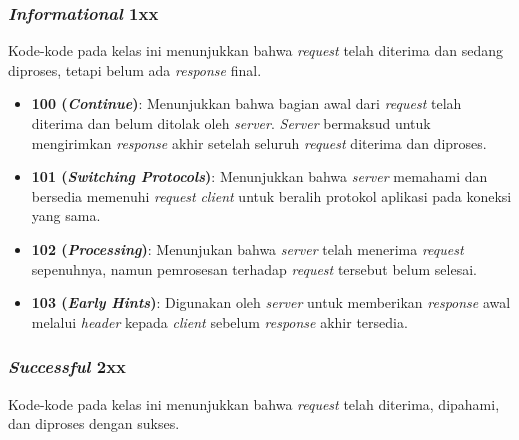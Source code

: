 \subsubsection{\textit{Informational} 1xx}
\label{subsubsec:020104-infotmational-1xx}

Kode-kode pada kelas ini menunjukkan bahwa \textit{request} telah diterima dan sedang diproses, tetapi belum ada \textit{response} final.

\begin{itemize}
    \item \textbf{100 (\textit{Continue})}: Menunjukkan bahwa bagian awal dari \textit{request} telah diterima dan belum ditolak oleh \textit{server}. \textit{Server} bermaksud untuk mengirimkan \textit{response} akhir setelah seluruh \textit{request} diterima dan diproses.
  
    \item \textbf{101 (\textit{Switching Protocols})}: Menunjukkan bahwa \textit{server} memahami dan bersedia memenuhi \textit{request} \textit{client} untuk beralih protokol aplikasi pada koneksi yang sama.
  
    \item \textbf{102 (\textit{Processing})}: Menunjukan bahwa \textit{server} telah menerima \textit{request} sepenuhnya, namun pemrosesan terhadap \textit{request} tersebut belum selesai.~\cite{RFC2518}
  
    \item \textbf{103 (\textit{Early Hints})}: Digunakan oleh \textit{server} untuk memberikan \textit{response} awal melalui \textit{header} kepada \textit{client} sebelum \textit{response} akhir tersedia.~\cite{RFC8297}
  
\end{itemize}

\subsubsection{\textit{Successful} 2xx}
\label{subsubsec:201004-successful-2xx}

Kode-kode pada kelas ini menunjukkan bahwa \textit{request} telah diterima, dipahami, dan diproses dengan sukses.

